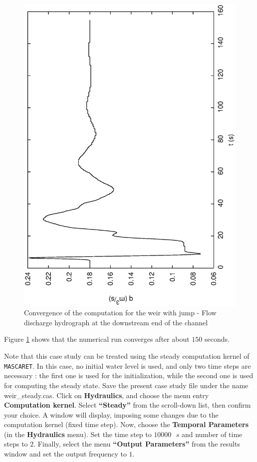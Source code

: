 \documentclass[a4paper,12pt]{article}
\begin{document}
\begin{figure}[h]
  \begin{center}
  \includegraphics[scale=0.5,angle=-90]{Qavecchoc}
  \caption{Convergence of the computation for the weir with jump - Flow discharge hydrograph at the downstream end of the channel}
  \label{fig:Conv-weir-jump}
  \end{center}
\end{figure}

Figure \ref{fig:Conv-weir-jump} shows that the numerical run converges after about $150$ seconds.

\vspace{0.5cm}

Note that this case study can be treated using  the steady computation
kernel of \texttt{MASCARET}. In this case, no initial water level is used,
and only two time steps are necessary : the first one is used for the initialization, while the second one is used for computing the steady state. 
Save the present case study file under the name weir\_steady.cas. Click on \textbf{Hydraulics}, and choose the menu
entry \textbf{Computation kernel}. Select \textbf{{}``Steady''}
from the scroll-down list, then confirm your choice. A window will display,
imposing some changes due to the computation kernel (fixed time step).
Now, choose the \textbf{Temporal Parameters} (in the \textbf{Hydraulics}
menu). Set the time step to $10000\mbox{ }s$ and number of time steps
to $2$. Finally, select the menu \textbf{{}``Output Parameters''}
from the results window and set the output frequency to $1$.
\end{document}
